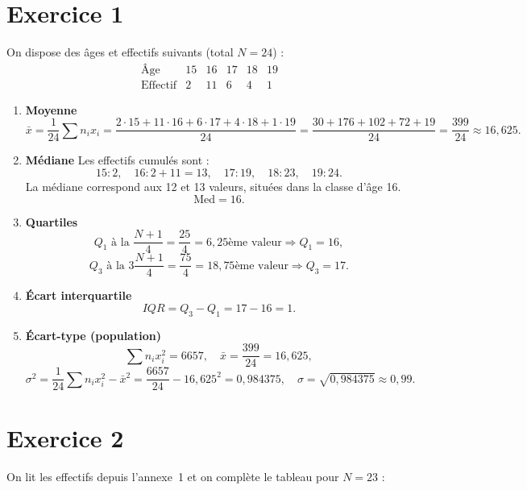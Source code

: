 \documentclass{article}
\theoremstyle{definition}
\begin{document}
\newpage
\section*{Exercice 1}
On dispose des âges et effectifs suivants (total $N=24$) :
\[
  \begin{array}{c|ccccc}
    \text{Âge}       & 15 & 16 & 17 & 18 & 19 \\ \hline
    \text{Effectif}  &  2 & 11 &  6 &  4 &  1
  \end{array}
\]

\begin{enumerate}
  \item \textbf{Moyenne}
    \[
      \bar{x}
      = \frac{1}{24}\sum n_i x_i
      = \frac{2\cdot15 + 11\cdot16 + 6\cdot17 + 4\cdot18 + 1\cdot19}{24}
      = \frac{30 + 176 + 102 + 72 + 19}{24}
      = \frac{399}{24}
      \approx 16{,}625.
    \]

  \item \textbf{Médiane}
    Les effectifs cumulés sont :
    \[
      15:2,\quad 16:2+11=13,\quad 17:19,\quad 18:23,\quad 19:24.
    \]
    La médiane correspond aux 12 et 13 valeurs, situées dans la classe d’âge 16.
    \[
      \mathrm{Med} = 16.
    \]

  \item \textbf{Quartiles}
    \[
      Q_1\text{ à la } \frac{N+1}{4} = \frac{25}{4} = 6{,}25\text{ème valeur}
      \Longrightarrow Q_1 = 16,
    \]
    \[
      Q_3\text{ à la } 3\frac{N+1}{4} = \frac{75}{4} = 18{,}75\text{ème valeur}
      \Longrightarrow Q_3 = 17.
    \]

  \item \textbf{Écart interquartile}
    \[
      IQR = Q_3 - Q_1 = 17 - 16 = 1.
    \]

  \item \textbf{Écart-type (population)}
    \[
      \sum n_i x_i^2
      = 6657,
      \quad
      \bar x = \frac{399}{24} = 16{,}625,
    \]
    \[
      \sigma^2
      = \frac{1}{24}\sum n_i x_i^2 - \bar x^2
      = \frac{6657}{24} - 16{,}625^2
      = 0{,}984375,
      \quad
      \sigma = \sqrt{0{,}984375} \approx 0{,}99.
    \]

\end{enumerate}

\section*{Exercice 2}
On lit les effectifs depuis l'annexe~1 et on complète le tableau pour $N=23$ :
\end{document}
